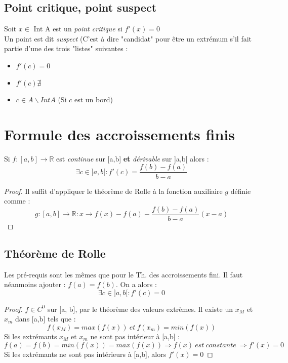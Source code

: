 \documentclass[11pt, a4paper, openany]{book}
\begin{document}
\subsection{Point critique, point suspect}
Soit $x \in$ Int A est un \textit{point critique} si $f'(x) = 0$\\
Un point est dit \textit{suspect} (C'est à dire "candidat" pour être un extrémum s'il fait partie d'une des trois "listes" suivantes :
\begin{itemize}
	\item $f'(c) = 0$
	\item $f'(c) \nexists$
	\item $c \in A\backslash Int A$ (Si $c$ est un bord)
\end{itemize}

\section{Formule des accroissements finis}
Si $f: [a,b] \rightarrow \mathbb{R}$ est \textit{continue} sur [a,b] \textbf{et} \textit{dérivable} sur ]a,b[ alors : \\
$$\exists c \in ]a,b[ : f'(c) = \frac{f(b)-f(a)}{b-a}$$
\begin{proof}
	Il suffit d'appliquer le théorème de Rolle à la fonction auxiliaire $g$ définie comme : 
	$$g : [a,b] \rightarrow \mathbb{R} : x \rightarrow f(x) - f(a) - \frac{f(b) - f(a)}{b-a}(x-a)$$
\end{proof}

\subsection{Théorème de Rolle}
Les pré-requis sont les mêmes que pour le Th. des accroissements fini. Il faut néanmoins ajouter : $f(a) = f(b)$. On a alors :
$$\exists c \in ]a,b[ : f'(c) = 0 $$
\begin{proof}
	$f \in C^{0}$ sur [a, b], par le théorème des valeurs extrèmes. Il existe un $x_{M}$ et $x_{m}$  dans [a,b] tels que : 
	$$f(x_{M}) = max(f(x))\ et\ f(x_{m}) = min(f(x))$$
	Si les extrémants $x_{M}$ et $x_{m}$ ne sont pas intérieur à [a,b] :
	$$f(a) = f(b) = min(f(x)) = max(f(x)) \Rightarrow f(x)\ est\ constante\  \Rightarrow f'(x) = 0$$
	Si les extrémants ne sont pas intérieurs à [a,b], alors $f'(x) = 0$
\end{proof}
\end{document}
